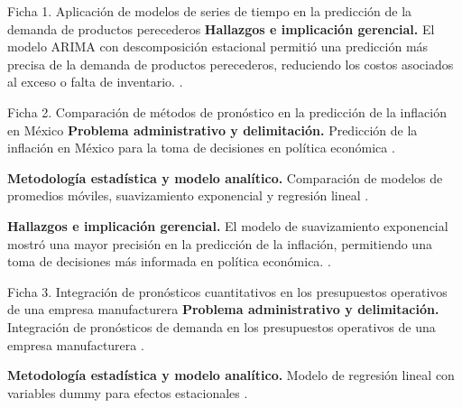 {\begin{fichainvestigacion}{Ficha 1. Aplicación de modelos de series de tiempo en la predicción de la demanda de productos perecederos}
\textbf{Hallazgos e implicación gerencial.} El modelo ARIMA con descomposición estacional permitió una predicción más precisa de la demanda de productos perecederos, reduciendo los costos asociados al exceso o falta de inventario. \citep{nistHandbook}.
\end{fichainvestigacion}

\begin{fichainvestigacion}{Ficha 2. Comparación de métodos de pronóstico en la predicción de la inflación en México}
\textbf{Problema administrativo y delimitación.} Predicción de la inflación en México para la toma de decisiones en política económica \citep{anderson2012,holmesBusiness2023}.

\textbf{Metodología estadística y modelo analítico.} Comparación de modelos de promedios móviles, suavizamiento exponencial y regresión lineal \citep{wackerly2010,lind2012}.

\textbf{Hallazgos e implicación gerencial.} El modelo de suavizamiento exponencial mostró una mayor precisión en la predicción de la inflación, permitiendo una toma de decisiones más informada en política económica. \citep{nistHandbook}.
\end{fichainvestigacion}

\begin{fichainvestigacion}{Ficha 3. Integración de pronósticos cuantitativos en los presupuestos operativos de una empresa manufacturera}
\textbf{Problema administrativo y delimitación.} Integración de pronósticos de demanda en los presupuestos operativos de una empresa manufacturera \citep{anderson2012,holmesBusiness2023}.

\textbf{Metodología estadística y modelo analítico.} Modelo de regresión lineal con variables dummy para efectos estacionales \citep{wackerly2010,lind2012}.


\end{fichainvestigacion}}
